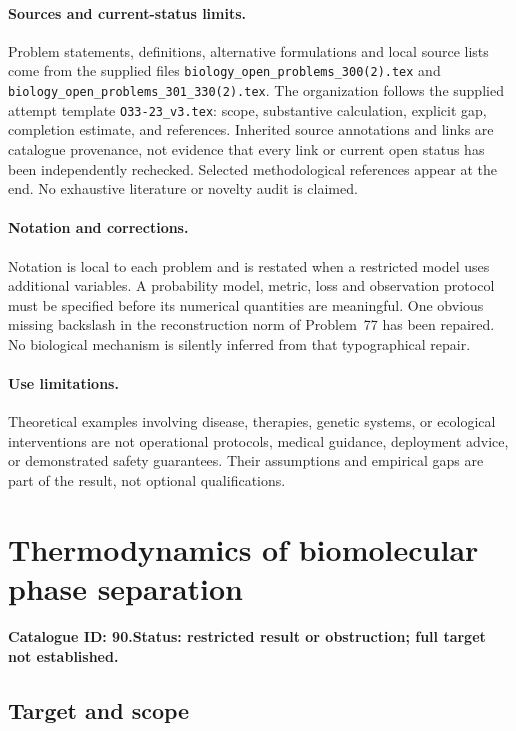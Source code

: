 \documentclass[11pt]{article}
\begin{document}
\paragraph{Sources and current-status limits.}
Problem statements, definitions, alternative formulations and local source lists
come from the supplied files
\texttt{biology\_open\_problems\_300(2).tex} and
\texttt{biology\_open\_problems\_301\_330(2).tex}.
The organization follows the supplied attempt template
\texttt{O33-23\_v3.tex}: scope, substantive calculation, explicit gap,
completion estimate, and references. Inherited source annotations and links are
catalogue provenance, not evidence that every link or current open status has
been independently rechecked. Selected methodological references appear at the
end. No exhaustive literature or novelty audit is claimed.

\paragraph{Notation and corrections.}
Notation is local to each problem and is restated when a restricted model uses
additional variables. A probability model, metric, loss and observation protocol
must be specified before its numerical quantities are meaningful. One obvious
missing backslash in the reconstruction norm of Problem~77 has been repaired.
No biological mechanism is silently inferred from that typographical repair.

\paragraph{Use limitations.}
Theoretical examples involving disease, therapies, genetic systems, or ecological
interventions are not operational protocols, medical guidance, deployment advice,
or demonstrated safety guarantees. Their assumptions and empirical gaps are part
of the result, not optional qualifications.

\setcounter{section}{89}
\section{Thermodynamics of biomolecular phase separation}
\label{prob:090}
\noindent\textbf{Catalogue ID: 90.}\quad \textbf{Status: restricted result or obstruction; full target not established.}
\subsection{Target and scope}
\end{document}
